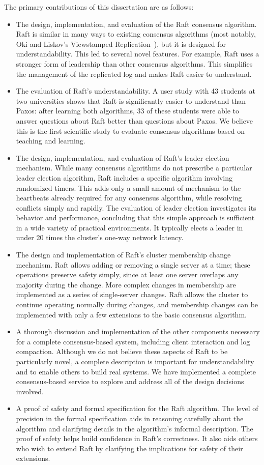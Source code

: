 The primary contributions of this dissertation are as follows:
%
\begin{itemize}
%
\item The design, implementation, and evaluation of the Raft consensus
algorithm. Raft is similar in many ways to existing consensus algorithms
(most notably, Oki and Liskov's Viewstamped Replication~\cite{Oki:1988,
Liskov:2012}), but it is designed for understandability. This led to
several novel features. For example, Raft uses a stronger form of
leadership than other consensus algorithms.
This simplifies the management of the replicated log and makes Raft
easier to understand.
%
\item The evaluation of Raft's understandability. A user study with 43
students at two universities shows that Raft is significantly easier to
understand than Paxos: after learning both algorithms, 33 of these
students were able to answer questions about Raft better than questions
about Paxos. We believe this is the first scientific study to evaluate
consensus algorithms based on teaching and learning.
%
\item The design, implementation, and evaluation of Raft's leader
election mechanism.  While many consensus algorithms do not prescribe a
particular leader election algorithm, Raft includes a specific algorithm
involving randomized timers. This adds only a small amount of mechanism
to the heartbeats already required for any consensus algorithm, while
resolving conflicts simply and rapidly. The evaluation of leader
election investigates its behavior and performance, concluding that this simple
approach is sufficient in a wide variety of practical environments. It
typically elects a leader in under 20 times the cluster's one-way
network latency.
%
\item The design and implementation of Raft's cluster membership change
mechanism. Raft allows adding or removing a single server at a time;
these operations preserve safety simply, since at least one server
overlaps any majority during the change. More complex changes in
membership are implemented as a series of single-server changes.
Raft allows the
cluster to continue operating normally during changes, and membership
changes can be implemented with only a few extensions to the basic
consensus algorithm.
%
\item A thorough discussion and implementation of the other components
necessary for a complete consensus-based system, including client
interaction and log compaction. Although we do not believe these aspects
of Raft to be particularly novel, a complete description is important
for understandability and to enable others to build real systems. We have
implemented a complete consensus-based service to explore and address
all of the design decisions involved.
%
\item A proof of safety and formal specification for the Raft algorithm.
The level of precision in the formal specification aids in reasoning
carefully about the algorithm and clarifying details in the algorithm's
informal description. The proof of safety helps build confidence in
Raft's correctness. It also aids others who wish to extend Raft by
clarifying the implications for safety of their extensions.
%
\end{itemize}

